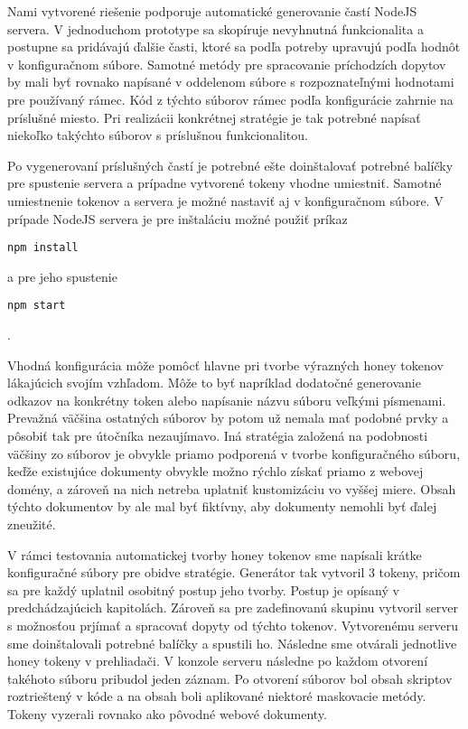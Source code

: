 \documentclass[conference, 11pt,slovak,a4paper,twoside]{IEEEtran}
\begin{document}
Nami vytvorené riešenie podporuje automatické generovanie častí NodeJS servera. V jednoduchom prototype sa skopíruje nevyhnutná funkcionalita a postupne sa pridávajú ďalšie časti, ktoré sa podľa potreby upravujú podľa hodnôt v konfiguračnom súbore. Samotné metódy pre spracovanie príchodzích dopytov by mali byť rovnako napísané v oddelenom súbore s rozpoznateľnými hodnotami pre používaný rámec. Kód z týchto súborov rámec podľa konfigurácie zahrnie na príslušné miesto. Pri realizácii konkrétnej stratégie je tak potrebné napísať niekoľko takýchto súborov s príslušnou funkcionalitou. 

Po vygenerovaní príslušných častí je potrebné ešte doinštalovať potrebné balíčky pre spustenie servera a prípadne vytvorené tokeny vhodne umiestniť. Samotné umiestnenie tokenov a servera je možné nastaviť aj v konfiguračnom súbore. V prípade NodeJS servera je pre inštaláciu možné použiť príkaz 

\begin{lstlisting}
npm install
\end{lstlisting} 

a pre jeho spustenie 

\begin{lstlisting}
npm start
\end{lstlisting}.

Vhodná konfigurácia môže pomôcť hlavne pri tvorbe výrazných honey tokenov lákajúcich svojím vzhľadom. Môže to byť napríklad dodatočné generovanie odkazov na konkrétny token alebo napísanie názvu súboru veľkými písmenami. Prevažná väčšina ostatných súborov by potom už nemala mať podobné prvky a pôsobiť tak pre útočníka nezaujímavo. Iná stratégia založená na podobnosti väčšiny zo súborov je obvykle priamo podporená v tvorbe konfiguračného súboru, keďže existujúce dokumenty obvykle možno rýchlo získať priamo z webovej domény, a zároveň na nich netreba uplatniť kustomizáciu vo vyššej miere. Obsah týchto dokumentov by ale mal byť fiktívny, aby dokumenty nemohli byť ďalej zneužité.

V rámci testovania automatickej tvorby honey tokenov sme napísali krátke konfiguračné súbory pre obidve stratégie. Generátor tak vytvoril 3 tokeny, pričom sa pre každý uplatnil osobitný postup jeho tvorby. Postup je opísaný v predchádzajúcich kapitolách. Zároveň sa pre zadefinovanú skupinu vytvoril server s možnosťou prjímať a spracovať dopyty od týchto tokenov. Vytvorenému serveru sme doinštalovali potrebné balíčky a spustili ho. Následne sme otvárali jednotlive honey tokeny v prehliadači. V konzole serveru následne po každom otvorení takéhoto súboru pribudol jeden záznam. Po otvorení súborov bol obsah skriptov roztrieštený v kóde a na obsah boli aplikované niektoré maskovacie metódy. Tokeny vyzerali rovnako ako pôvodné webové dokumenty.  
\end{document}

